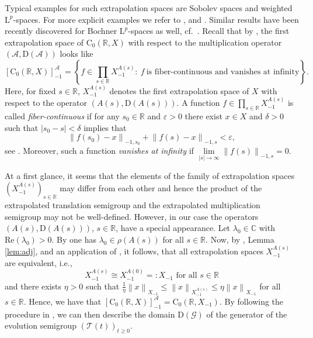 \documentclass[a4paper,oneside,10pt]{amsart}
\theoremstyle{definition}
\numberwithin{equation}{section}
\def\dom{\mathrm{D}}
\def\CC{\mathbb{C}}
\def\RR{\mathbb{R}}
\begin{document}
Typical examples for such extrapolation spaces are Sobolev spaces and weighted $\mathrm{L}^p$-spaces. For more explicit examples we refer to \cite[Ex.~II.5.7,5.8]{EN}, \cite[Sect.~3]{NNR1996} and \cite[Sect.~5]{BF2019}. Similar results have been recently discovered for Bochner $\mathrm{L}^p$-spaces as well, cf.~\cite{BH2022}. Recall that by \cite[Thm.~4.7]{G1997}, the first extrapolation space of $\mathrm{C}_0(\RR,X)$ with respect to the multiplication operator $(\mathcal{A},\dom(\mathcal{A}))$ looks like
\[
\left[\mathrm{C}_0(\RR,X)\right]_{-1}^{\mathcal{A}}=\left\{f\in\prod_{s\in\RR}{{X_{-1}^{A(s)}}}:\ f\ \text{is fiber-continuous and vanishes at infinity}\right\}.
\]
Here, for fixed  $s\in\RR$, $X_{-1}^{A(s)}$ denotes the first extrapolation space of $X$ with respect to the operator $(A(s),\dom(A(s)))$. A function $f\in\prod_{s\in\RR}{X_{-1}^{A(s)}}$ is called \emph{fiber-continuous} if for any $s_0\in\RR$ and $\varepsilon>0$ there exist $x\in X$ and $\delta>0$ such that $\left|s_0-s\right|<\delta$ implies that 
$$\left\|f(s_0)-x\right\|_{-1,s_0}+\left\|f(s)-x\right\|_{-1,s}<\varepsilon,$$
see \cite[Def.~4.4]{G1997}. Moreover, such a function \emph{vanishes at infinity} if $\lim\limits_{\left|s\right|\to\infty}{\left\|f(s)\right\|_{-1,s}}=0$. 
 
\medskip 
At a first glance, it seems that the elements of the family of extrapolation spaces $(X_{-1}^{A(s)})_{s\in\RR}$ may differ from each other and hence the product of the extrapolated translation semigroup and the extrapolated multiplication semigroup may not be well-defined. However, in our case the operators $(A(s),\dom(A(s)))$, $s\in\RR$, have a special appearance.
  {Let ${\lambda_0}\in\CC$ with $\mathrm{Re}({\lambda_0})>0$. By \cite[Cor.~18.13]{BKR2017} one has {${\lambda_0}\in\rho(A(s))$ for all $s\in\RR$.} 
{Now, by \cite[Rem.~6.6(c)]{A1997}, Lemma \ref{lem:adj},} and an application of \cite[Exercise~{II}.5.9(1)]{EN}, 
it follows, that all extrapolation spaces $X_{-1}^{A(s)}$ are equivalent, i.e., 
\begin{equation*}\label{X-1}
X_{-1}^{A(s)}\cong X_{-1}^{A(0)}=:X_{-1} \text{  for all } s\in\RR
\end{equation*}
and there exists $\eta>0$ such that $\frac{1}{\eta}\left\|x\right\|_{X_{-1}}\leq\left\|x\right\|_{X_{-1}^{A(s)}}\leq\eta\left\|x\right\|_{X_{-1}}$ for all $s\in\RR$.} Hence, we have that {$\left[\mathrm{C}_0(\RR,X)\right]_{-1}^{\mathcal{A}}=\mathrm{C}_0(\RR,X_{-1})$.}
By following the procedure in \cite[Sect.~4]{NNR1996}, we 
 can then describe the domain $\dom(\mathcal{G})$ of the generator of the evolution semigroup $(\mathcal{T}(t))_{t\geq0}$.
\end{document}

